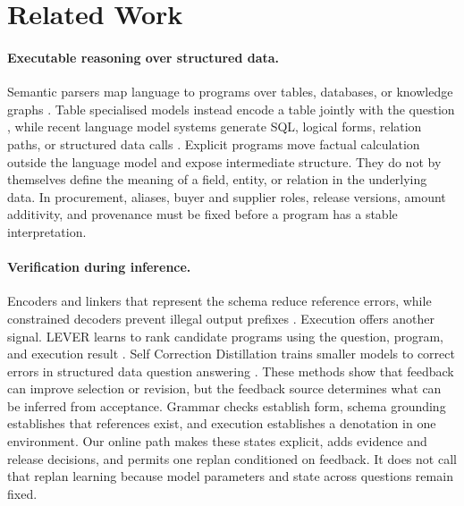 \section{Related Work}
\label{sec:related}

\paragraph{Executable reasoning over structured data.}
Semantic parsers map language to programs over tables, databases, or knowledge graphs
\citep{pasupat2015compositional,wang2020ratsql,cheng2023binder}.  Table specialised models instead
encode a table jointly with the question \citep{herzig2020tapas,yin2020tabert,liu2022tapex}, while
recent language model systems generate SQL, logical forms, relation paths, or structured data calls
\citep{jiang2023structgpt,luo2024chatkbqa,luo2024rog}.  Explicit programs move factual calculation
outside the language model and expose intermediate structure.  They do not by themselves define
the meaning of a field, entity, or relation in the underlying data.  In procurement, aliases, buyer
and supplier roles, release versions, amount additivity, and provenance must be fixed before a
program has a stable interpretation.

\paragraph{Verification during inference.}
Encoders and linkers that represent the schema reduce reference errors, while constrained decoders prevent
illegal output prefixes \citep{wang2020ratsql,scholak2021picard}.  Execution offers another signal.
LEVER learns to rank candidate programs using the question, program, and execution result
\citep{ni2023lever}.  Self Correction Distillation trains smaller models to correct errors in
structured data question answering
\citep{zhu2026scd}.  These methods show that feedback can improve selection or revision, but the
feedback source determines what can be inferred from acceptance.  Grammar checks establish form,
schema grounding establishes that references exist, and execution establishes a denotation in one
environment.  Our online path makes these states explicit, adds evidence and release decisions,
and permits one replan conditioned on feedback.  It does not call that replan learning because model
parameters and state across questions remain fixed.

